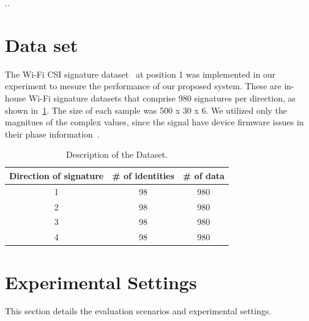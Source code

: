 \label{chp:Experiments}
..
\section{Data set}
\label{sec:Dataset}
The Wi-Fi CSI signature dataset~\cite{moon2017air} at position 1 was implemented in our experiment to mesure the performance of our proposed system. These are in-house Wi-Fi signature datasets that comprise 980 signatures per direction, as shown in~\ref{tab_dataset}. The size of each sample was 500 x 30 x 6. 
We utilized only the magnitues of the complex values, since the signal have device firmware issues in their phase information~\cite{wang2015understanding}. 
\begin{table}
    \caption{Description of the Dataset.}
    \label{tab_dataset}
    \begin{tabular}{ccc}
    \hline
    Direction of signature & \# of identities & \# of data \\ 
    \hline
    1                      & 98               & 980        \\ 
    2                      & 98               & 980        \\ 
    3                      & 98               & 980        \\ 
    4                      & 98               & 980        \\ 
    \hline
    \end{tabular}
\end{table}

\section{Experimental Settings}
This section details the evaluation scenarios and experimental settings.

